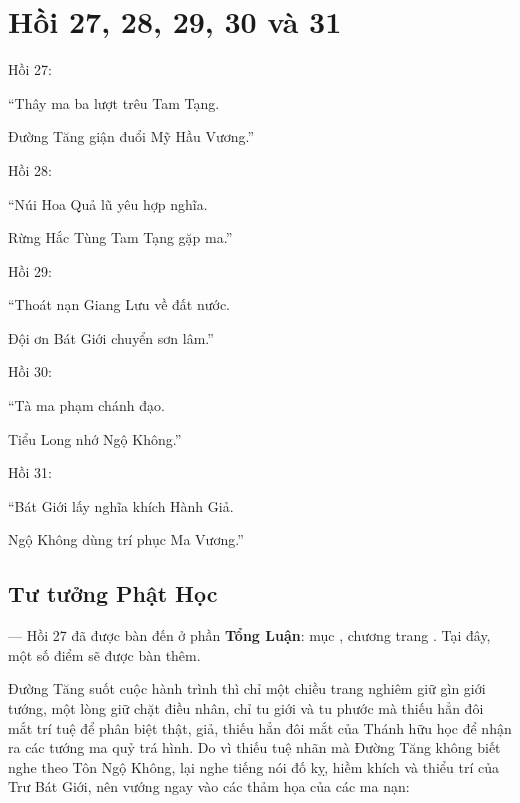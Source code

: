 \chapter{Hồi 27, 28, 29, 30 và 31} %
\label{cha:hoi_27_28}

Hồi 27:

\begin{itshape}
``Thây ma ba lượt trêu Tam Tạng.

Đường Tăng giận đuổi Mỹ Hầu Vương.''
\end{itshape}

Hồi 28:

\begin{itshape}
``Núi Hoa Quả lũ yêu hợp nghĩa.

Rừng Hắc Tùng Tam Tạng gặp ma.''
\end{itshape}

Hồi 29:

\begin{itshape}
``Thoát nạn Giang Lưu về đất nước.

Đội ơn Bát Giới chuyển sơn lâm.''
\end{itshape}

Hồi 30:

\begin{itshape}
``Tà ma phạm chánh đạo.

Tiểu Long nhớ Ngộ Không.''
\end{itshape}

Hồi 31:

\begin{itshape}
``Bát Giới lấy nghĩa khích Hành Giả.

Ngộ Không dùng trí phục Ma Vương.''
\end{itshape}

\section{Tư tưởng Phật Học} %
\label{sec:27_28_phat_hoc}

--- Hồi 27 đã được bàn đến ở phần {\bf Tổng Luận}: mục , chương  trang \pageref{sec:bieu_tuong_cua_hoi_thu_26}. Tại đây, một số điểm sẽ được bàn thêm.

Đường Tăng suốt cuộc hành trình thì chỉ một chiều trang nghiêm giữ gìn giới tướng, một lòng giữ chặt điều nhân, chỉ tu giới và tu phước mà thiếu hẳn đôi mắt trí tuệ để phân biệt thật, giả, thiếu hẳn đôi mắt của Thánh hữu học để nhận ra các tướng ma quỷ trá hình. Do vì thiếu tuệ nhãn mà Đường Tăng không biết nghe theo Tôn Ngộ Không, lại nghe tiếng nói đố kỵ, hiềm khích và thiểu trí của Trư Bát Giới, nên vướng ngay vào các thảm họa của các ma nạn:

